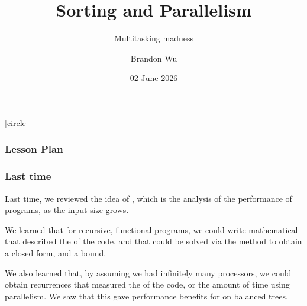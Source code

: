 \documentclass[aspectratio=169]{beamer}
\title{Sorting and Parallelism} %
\subtitle{Multitasking madness} %
\date{02 June 2026} %
\author{Brandon Wu} %
\newif\ifcolorlambda
\begin{document}
\ifweb
    \renewcommand{\pause}{}
\fi

[circle]

{
\begin{frame}[plain]
    \colorlambdatrue
    \titlepage
\end{frame}
}

\begin{frame}[fragile]
  \frametitle{Lesson Plan}

  \tableofcontents
\end{frame}

\begin{frame}[fragile]
  \frametitle{Last time}

  Last time, we reviewed the idea of , which is the analysis
  of the performance of programs, as the input size grows.

  \pause
  \vspace{\fill}

  We learned that for recursive, functional programs, we could write mathematical
   that described the  of the code, and that could be solved
  via the  method to obtain a closed form, and a bound.

  \pause
  \vspace{\fill}

  We also learned that, by assuming we had infinitely many processors, we could
  obtain recurrences that measured the  of the code, or the amount of time
  using parallelism. We saw that this gave performance benefits for  on
  balanced trees.
\end{frame}


\end{document}
